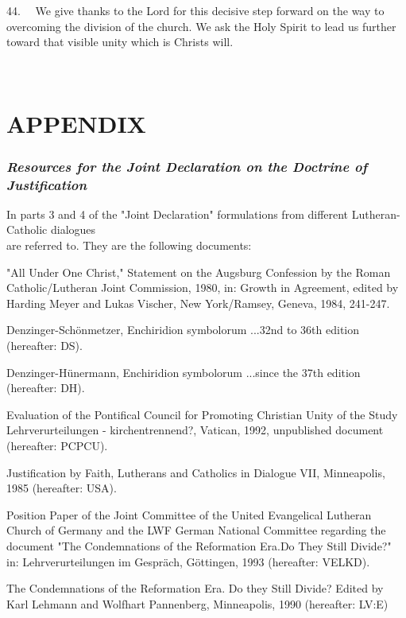 44.~ ~We give thanks to the Lord for this decisive step forward on the
way to overcoming the division of the church. We ask the Holy Spirit to
lead us further toward that visible unity which is
Christ\textquotesingle s will.

~

\section{APPENDIX}\label{appendix}

\subsubsection{\texorpdfstring{\emph{Resources for the Joint Declaration
on the Doctrine of
Justification}}{Resources for the Joint Declaration on the Doctrine of Justification}}\label{resources-for-the-joint-declaration-on-the-doctrine-of-justification}

In parts 3 and 4 of the "Joint Declaration" formulations from different
Lutheran-Catholic dialogues\\
are referred to. They are the following documents:

"All Under One Christ," Statement on the Augsburg Confession by the
Roman Catholic/Lutheran Joint Commission, 1980, in: Growth in Agreement,
edited by Harding Meyer and Lukas Vischer, New York/Ramsey, Geneva,
1984, 241-247.

Denzinger-Schönmetzer, Enchiridion symbolorum ...32nd to 36th edition
(hereafter: DS).

Denzinger-Hünermann, Enchiridion symbolorum ...since the 37th edition
(hereafter: DH).

Evaluation of the Pontifical Council for Promoting Christian Unity of
the Study Lehrverurteilungen - kirchentrennend?, Vatican, 1992,
unpublished document (hereafter: PCPCU).

Justification by Faith, Lutherans and Catholics in Dialogue VII,
Minneapolis, 1985 (hereafter: USA).

Position Paper of the Joint Committee of the United Evangelical Lutheran
Church of Germany and the LWF German National Committee regarding the
document "The Condemnations of the Reformation Era.Do They Still
Divide?" in: Lehrverurteilungen im Gespräch, Göttingen, 1993 (hereafter:
VELKD).

The Condemnations of the Reformation Era. Do they Still Divide? Edited
by Karl Lehmann and Wolfhart Pannenberg, Minneapolis, 1990 (hereafter:
LV:E)

